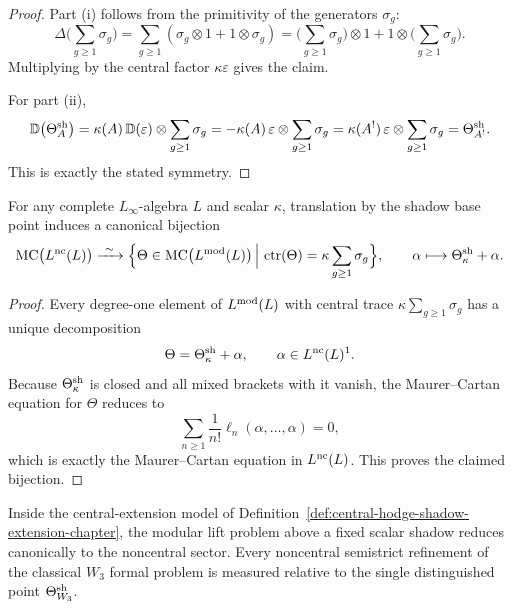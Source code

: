 \begin{proof}
Part \textup{(i)} follows from the primitivity of the generators $\sigma_g$:
\[
\Delta\Big(\sum_{g\ge1}\sigma_g\Big)
=
\sum_{g\ge1}(\sigma_g\otimes 1+1\otimes\sigma_g)
=
\Big(\sum_{g\ge1}\sigma_g\Big)\otimes 1 + 1\otimes\Big(\sum_{g\ge1}\sigma_g\Big).
\]
Multiplying by the central factor $\kappa\varepsilon$ gives the claim.

For part \textup{(ii)},
\[
\mathbb D\bigl(\Theta_A^{\mathrm{sh}}\bigr)
=
\kappa(A)\,\mathbb D(\varepsilon)\otimes\sum_{g\ge1}\sigma_g
=
-\kappa(A)\,\varepsilon\otimes\sum_{g\ge1}\sigma_g
=
\kappa(A^!)\,\varepsilon\otimes\sum_{g\ge1}\sigma_g
=
\Theta_{A^!}^{\mathrm{sh}}.
\]
This is exactly the stated symmetry.\qedhere
\end{proof}

\begin{theorem}
\label{thm:fiber-decomposition-shadow-base-point-chapter}
For any complete $L_\infty$-algebra $L$ and scalar $\kappa$, translation
by the shadow base point induces a canonical bijection
\[
\operatorname{MC}\bigl(L^{\mathrm{nc}}(L)\bigr)
\xrightarrow{\ \sim\ }
\Bigl\{\Theta\in\operatorname{MC}\bigl(L^{\mathrm{mod}}(L)\bigr)
\,\Big|\,
\operatorname{ctr}(\Theta)=\kappa\sum_{g\ge1}\sigma_g\Bigr\},
\qquad
\alpha\longmapsto \Theta^{\mathrm{sh}}_{\kappa}+\alpha.
\]
\end{theorem}

\begin{proof}
Every degree-one element of $L^{\mathrm{mod}}(L)$ with central trace
$\kappa\sum_{g\ge1}\sigma_g$ has a unique decomposition
\[
\Theta=\Theta^{\mathrm{sh}}_{\kappa}+\alpha,
\qquad
\alpha\in L^{\mathrm{nc}}(L)^1.
\]
Because $\Theta^{\mathrm{sh}}_{\kappa}$ is closed and all mixed brackets with it
vanish, the Maurer--Cartan equation for $\Theta$ reduces to
\[
\sum_{n\ge1}\frac1{n!}\ell_n(\alpha,\ldots,\alpha)=0,
\]
which is exactly the Maurer--Cartan equation in $L^{\mathrm{nc}}(L)$. This
proves the claimed bijection.\qedhere
\end{proof}

\begin{corollary}
\label{cor:shadow-centered-reduction-chapter}
Inside the central-extension model of
Definition~\ref{def:central-hodge-shadow-extension-chapter}, the
modular lift problem above a fixed scalar shadow reduces canonically to
the noncentral sector. Every noncentral semistrict refinement of the
classical $W_3$ formal problem is measured relative to the single
distinguished point $\Theta^{\mathrm{sh}}_{W_3}$.
\end{corollary}


